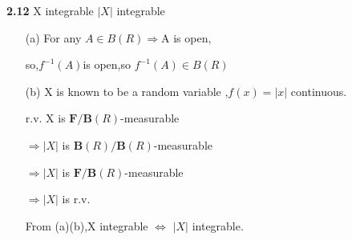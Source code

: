 \noindent\textbf{2.12} X integrable  $|X|$ integrable

\begin{enumerate}
    \item[(a)]For any $A\in B(R)\Rightarrow $A is open,

so,$f^{-1}(A)$is open,so $f^{-1}(A)\in B(R)$

\item[(b)]X is known to be a random variable ,$f(x)=|x|$ continuous.

r.v. X is $\textbf{F}/\textbf{B}(R)$-measurable

$\Rightarrow |X|$ is $\textbf{B}(R)/\textbf{B}(R)$-measurable

$\Rightarrow |X|$ is $\textbf{F}/\textbf{B}(R)$-measurable

$\Rightarrow |X|$ is r.v.

From (a)(b),X integrable $\Leftrightarrow$ $| X |$ integrable.
\end{enumerate}



